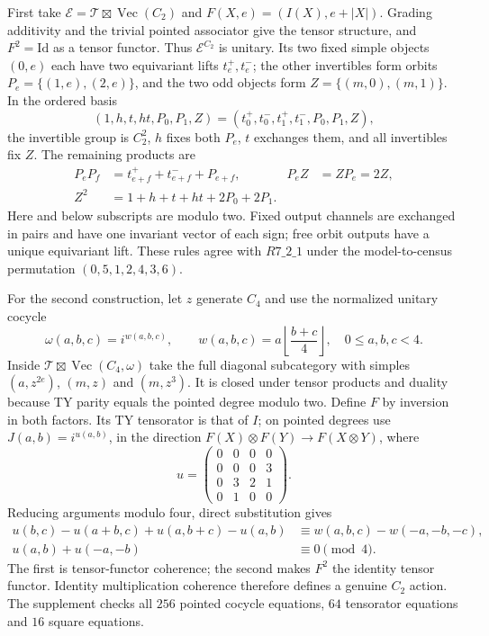 \documentclass[11pt]{article}
\begin{document}
First take $\mathcal E=\mathcal T\boxtimes\operatorname{Vec}(C_2)$ and
$F(X,e)=(I(X),e+|X|)$. Grading additivity and the trivial pointed
associator give the tensor structure, and $F^2=\mathrm{Id}$ as a tensor
functor. Thus $\mathcal E^{C_2}$ is unitary. Its two fixed simple objects
$(0,e)$ each have two equivariant lifts $t_e^+,t_e^-$; the other
invertibles form orbits $P_e=\{(1,e),(2,e)\}$, and the two odd objects
form $Z=\{(m,0),(m,1)\}$. In the ordered basis
\[
 (1,h,t,ht,P_0,P_1,Z)=(t_0^+,t_0^-,t_1^+,t_1^-,P_0,P_1,Z),
\]
the invertible group is $C_2^2$, $h$ fixes both $P_e$, $t$ exchanges
them, and all invertibles fix $Z$. The remaining products are
\begin{align*}
 P_eP_f&=t_{e+f}^++t_{e+f}^-+P_{e+f},& P_eZ&=ZP_e=2Z,\\
 Z^2&=1+h+t+ht+2P_0+2P_1.&&
\end{align*}
Here and below subscripts are modulo two. Fixed output channels are
exchanged in pairs and have one invariant vector of each sign; free
orbit outputs have a unique equivariant lift. These rules agree with
$R7\_2\_1$ under the model-to-census permutation $(0,5,1,2,4,3,6)$.

For the second construction, let $z$ generate $C_4$ and use the
normalized unitary cocycle
\[
 \omega(a,b,c)=i^{w(a,b,c)},\qquad
 w(a,b,c)=a\left\lfloor\frac{b+c}{4}\right\rfloor,
 \quad 0\leq a,b,c<4.
\]
Inside $\mathcal T\boxtimes\operatorname{Vec}(C_4,\omega)$ take the
full diagonal subcategory with simples $(a,z^{2e})$, $(m,z)$ and
$(m,z^3)$. It is closed under tensor products and duality because TY
parity equals the pointed degree modulo two. Define $F$ by inversion in
both factors. Its TY tensorator is that of $I$; on pointed degrees use
$J(a,b)=i^{u(a,b)}$, in the direction $F(X)\otimes F(Y)\to F(X\otimes Y)$,
where
\[
 u=\begin{pmatrix}0&0&0&0\\0&0&0&3\\0&3&2&1\\0&1&0&0\end{pmatrix}.
\]
Reducing arguments modulo four, direct substitution gives
\begin{align*}
 u(b,c)-u(a+b,c)+u(a,b+c)-u(a,b)
   &\equiv w(a,b,c)-w(-a,-b,-c),\\
 u(a,b)+u(-a,-b)&\equiv0\pmod4.
\end{align*}
The first is tensor-functor coherence; the second makes $F^2$ the
identity tensor functor. Identity multiplication coherence therefore
defines a genuine $C_2$ action. The supplement checks all $256$ pointed
cocycle equations, $64$ tensorator equations and $16$ square equations.
\end{document}
